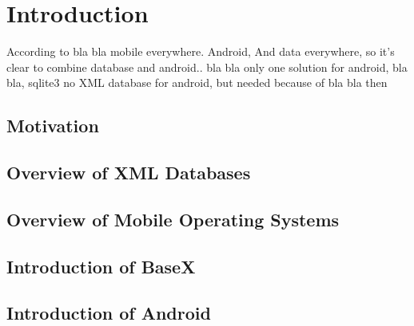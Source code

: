 \chapter{Introduction}
According to bla bla mobile everywhere. Android, And data everywhere, so it's clear to combine database and android.. bla bla
only one solution for android, bla bla, sqlite3
no XML database for android, but needed because of bla bla
then 
\section{Motivation}
\label{sec:motivation}

\section{Overview of XML Databases}

\section{Overview of Mobile Operating Systems}

\section{Introduction of BaseX}
\label{sec:overview-of-basex}

\section{Introduction of Android}
\label{sec:introduction-of-basex}




